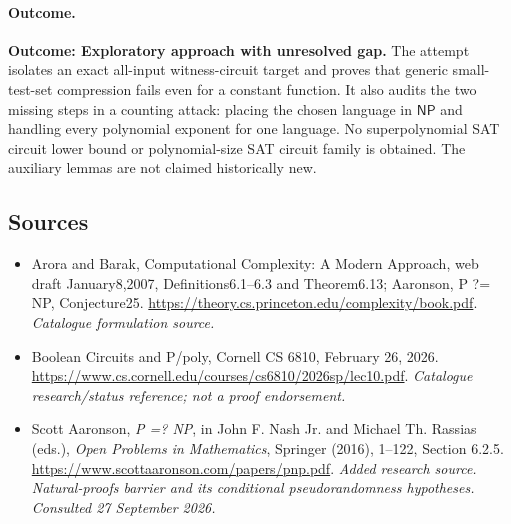 \documentclass[11pt,a4paper]{article}
\begin{document}
\paragraph{Outcome.}
\textbf{Outcome: Exploratory approach with unresolved gap.}
The attempt isolates an exact all-input witness-circuit target and proves
that generic small-test-set compression fails even for a constant
function. It also audits the two missing steps in a counting attack:
placing the chosen language in $\mathsf{NP}$ and handling every polynomial
exponent for one language. No superpolynomial SAT circuit lower bound or
polynomial-size SAT circuit family is obtained. The auxiliary lemmas
are not claimed historically new.
\subsection{Sources}
\begin{itemize}\raggedright
\item[\textnormal{[S1]}]\hypertarget{source:30006678:1}{} Arora and Barak, Computational Complexity: A Modern Approach, web draft January8,2007, Definitions6.1–6.3 and Theorem6.13; Aaronson, P ?= NP, Conjecture25.
\url{https://theory.cs.princeton.edu/complexity/book.pdf}.
{\small\textit{Catalogue formulation source.}}
\item[\textnormal{[S2]}]\hypertarget{source:30006678:2}{} Boolean Circuits and P/poly, Cornell CS 6810, February 26, 2026.
\url{https://www.cs.cornell.edu/courses/cs6810/2026sp/lec10.pdf}.
{\small\textit{Catalogue research/status reference; not a proof endorsement.}}
\item[\textnormal{[E1]}]\hypertarget{extra:30006678:1}{} Scott Aaronson, \emph{P =? NP}, in John F. Nash Jr. and Michael Th. Rassias (eds.), \emph{Open Problems in Mathematics}, Springer (2016), 1--122, Section 6.2.5.
\url{https://www.scottaaronson.com/papers/pnp.pdf}.
{\small\textit{Added research source. Natural-proofs barrier and its conditional pseudorandomness hypotheses. Consulted 27 September 2026.}}
\end{itemize}

\end{document}
